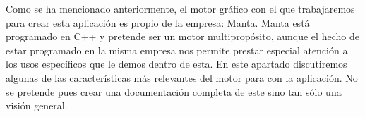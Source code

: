 Como se ha mencionado anteriormente, el motor gráfico con el que trabajaremos para crear esta aplicación es propio de la empresa: Manta. Manta está programado en C++ y pretende ser un motor multipropósito, aunque el hecho de estar programado en la misma empresa nos permite prestar especial atención a los usos específicos que le demos dentro de esta. En este apartado discutiremos algunas de las características más relevantes del motor para con la aplicación. No se pretende pues crear una documentación completa de este sino tan sólo una visión general.



